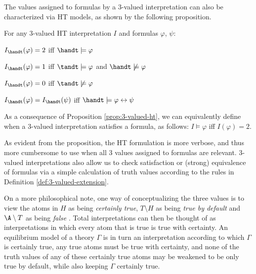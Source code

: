 The values assigned to formulas by a 3-valued interpretation can also
be characterized via HT models, as shown by the following proposition.

\begin{proposition}\label{prop:3-valued-ht}
For any 3-valued HT interpretation $I$ and formulas $\varphi$, $\psi$:
\begin{description}
  \item $I_{\handt}(\varphi) = 2$ iff $\handt \models \varphi$ 
  \item $I_{\handt}(\varphi) = 1$ iff $\tandt \models \varphi$ and $\handt \not\models \varphi$
  \item $I_{\handt}(\varphi) = 0$ iff $\tandt \not\models \varphi$
  \item  $I_{\handt}(\varphi) = I_{\handt}(\psi)$ iff $\handt \models \varphi \leftrightarrow \psi$
\end{description}
\end{proposition}

As a consequence of Proposition \ref{prop:3-valued-ht}, we can
equivalently define when a 3-valued interpretation satisfies a
formula, as follows: $I \models \varphi$ iff $I(\varphi)=2$.

As evident from the proposition, the HT formulation is more verbose,
and thus more cumbersome to use when all 3 values assigned to formulas
are relevant. 3-valued interpretations also allow us to check
satisfaction or (strong) equivalence of formulas via a simple
calculation of truth values according to the rules in Definition
\ref{def:3-valued-extension}.

On a more philosophical note, one way of conceptualizing the three
values is to view the atoms in $H$ as being \textit{certainly true},
$T \setminus H$ as being \textit{true by default} and $\A \setminus T$
as being \textit{false} \cite{capeva17a}. Total interpretations can
then be thought of as interpretations in which every atom that is true
is true with certainty. An equilibrium model of a theory $\Gamma$ is in
turn an interpretation according to which $\Gamma$ is certainly true,
any true atoms must be true with certainty, and none of the truth
values of any of these certainly true atoms may be weakened to be only
true by default, while also keeping $\Gamma$ certainly true.

